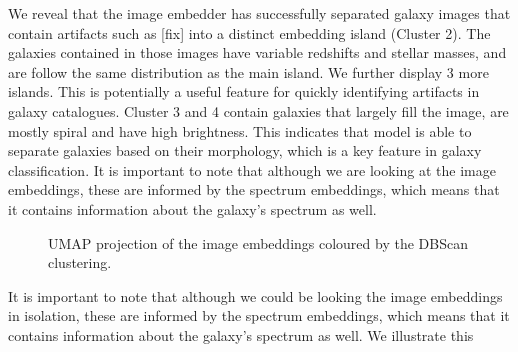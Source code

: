 \documentclass[a4paper,12pt]{article}
\begin{document}
We reveal that the image embedder has successfully separated galaxy images that contain artifacts such as [fix] into a distinct embedding island (Cluster 2). The galaxies contained in those images have variable redshifts and stellar masses, and are follow the same distribution as the main island. We further display 3 more islands. This is potentially a useful feature for quickly identifying artifacts in galaxy catalogues. Cluster 3 and 4 contain galaxies that largely fill the image, are mostly spiral and have high brightness. This indicates that model is able to separate galaxies based on their morphology, which is a key feature in galaxy classification. It is important to note that although we are looking at the image embeddings, these are informed by the spectrum embeddings, which means that it contains information about the galaxy's spectrum as well.

\begin{figure}[H]
    \centering
    \caption{UMAP projection of the image embeddings coloured by the DBScan clustering.}
    \label{fig:umap_DBSCAN}
\end{figure}

It is important to note that although we could be looking the image embeddings in isolation, these are informed by the spectrum embeddings, which means that it contains information about the galaxy's spectrum as well. We illustrate this 




\newpage


\end{document}
